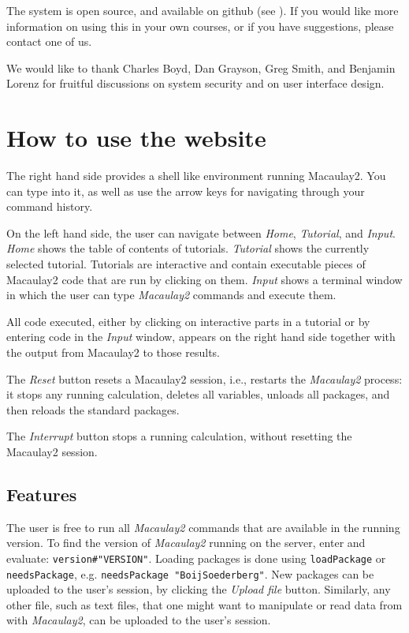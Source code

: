 \documentclass[]{article}
\def\M2{{\it Macaulay2}}
\begin{document}
The system is open source, and available on github (see \cite{github}).
If you would like more information on using this in your own courses,
or if you have suggestions, please contact one of us.

We would like to thank Charles Boyd, Dan Grayson, Greg Smith, and Benjamin Lorenz for
fruitful discussions on system security and on user interface design.

\section{How to use the website}
The right hand side provides a shell like environment running
Macaulay2. You can type into it, as well as use the arrow keys for
navigating through your command history.

On the left hand side, the user can navigate between {\it Home}, {\it
  Tutorial}, and {\it Input}. {\it Home} shows the table of contents
of tutorials. {\it Tutorial} shows the currently selected
tutorial. Tutorials are interactive and contain executable pieces of
Macaulay2 code that are run by clicking on them. {\it Input} shows a
terminal window in which the user can type {\it Macaulay2} commands and execute them.

All code executed, either by clicking on interactive parts in a
tutorial or by entering code in the {\it Input} window, appears on the
right hand side together with the output from Macaulay2 to those
results.

The {\it Reset} button resets a Macaulay2 session, i.e., restarts 
the \M2 process: it stops any running calculation, deletes all variables, 
unloads all packages, and then reloads the standard packages.

The {\it Interrupt} button stops a running calculation, without
resetting the Macaulay2 session.

\subsection{Features}

The user is free to run all \M2 commands that are available in the
running version. To find the version of \M2 running on the server,
enter and evaluate: {\tt version\#"VERSION"}.  Loading packages is
done using {\tt loadPackage} or {\tt needsPackage}, e.g. {\tt needsPackage "BoijSoederberg"}.  
New packages can be
uploaded to the user's session, by clicking the {\it Upload file}
button. Similarly, any other file, such as text files, that one might
want to manipulate or read data from with \M2, can be uploaded to
the user's session.
\end{document}

